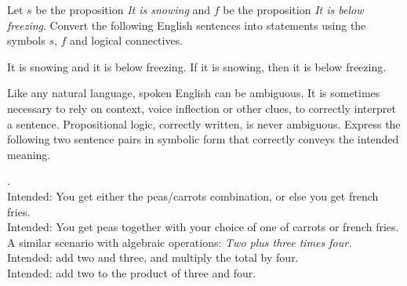 \begin{prob}
Let $s$ be the proposition {\it It is snowing} and $f$ be the proposition 
{\it It is below freezing}. Convert the following English sentences into statements
using the symbols $s$, $f$ and logical connectives.

\begin{tasks}
       \task It is snowing and it is below freezing.
       \task If it is snowing, then it is below freezing.
\end{tasks}
\end{prob}

 
\begin{prob}
Like any natural language, spoken English can be ambiguous. It is sometimes necessary to rely on context, voice inflection or other clues, to correctly interpret a sentence. Propositional logic, correctly written, is never ambiguous. Express the following two sentence pairs in symbolic form that correctly conveys the intended meaning.
\begin{tasks}
 . \\
 Intended: You get either the peas/carrots combination, or else you get french fries.\\
 Intended: You get  peas together with your choice  of one of carrots  or french fries.\\
 
 \task  A similar scenario with algebraic operations: {\itshape Two plus three times four.}\\
Intended: add two and three, and multiply the total by four. \\
Intended: add two to the product of three and four.
\end{tasks}
\end{prob}
